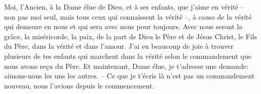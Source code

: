 Moi, l’Ancien, à la Dame élue de Dieu, et à ses enfants, que j’aime en vérité
	– non pas moi seul, mais tous ceux qui connaissent la vérité –,
	à cause de la vérité qui demeure en nous
	et qui sera avec nous pour toujours.
Avec nous seront la grâce, la miséricorde, la paix,
	de la part de Dieu le Père et de Jésus Christ, le Fils du Père,
	dans la vérité et dans l’amour.
J’ai eu beaucoup de joie
		à trouver plusieurs de tes enfants qui marchent dans la vérité
	selon le commandement que nous avons reçu du Père.
Et maintenant, Dame élue, je t’adresse une demande:
	aimons-nous les uns les autres.
– Ce que je t’écris là n’est pas un commandement nouveau,
	nous l’avions depuis le commencement.
